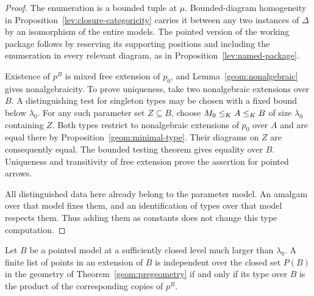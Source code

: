 \begin{proof}
The enumeration is a bounded tuple at $\mu$.  Bounded-diagram
homogeneity in Proposition~\ref{lev:closure-categoricity} carries it
between any two instances of $\Delta$ by an isomorphism of the entire
models.  The pointed version of the working package follows by
reserving its supporting positions and including the enumeration in
every relevant diagram, as in
Proposition~\ref{lev:named-package}.

Existence of $p^B$ is mixed free extension of $p_0$, and
Lemma~\ref{geom:nonalgebraic} gives nonalgebraicity.  To prove
uniqueness, take two nonalgebraic extensions over $B$.  A distinguishing
test for singleton types may be chosen with a fixed bound below
$\lambda_0$.  For any such parameter set $Z\subseteq B$, choose
$M_0\leq_K A\leq_K B$ of size $\lambda_0$ containing $Z$.
Both types restrict to nonalgebraic extensions of $p_0$ over $A$ and
are equal there by Proposition~\ref{geom:minimal-type}.  Their
diagrams on $Z$ are consequently equal.  The bounded testing theorem
gives equality over $B$.  Uniqueness and transitivity of free
extension prove the assertion for pointed arrows.

All distinguished data here already belong to the parameter model.
An amalgam over that model fixes them, and an identification of types
over that model respects them.  Thus adding them as constants does
not change this type computation.
\end{proof}

\begin{proposition}
\label{geom:base-change}
Let $B$ be a pointed model at a sufficiently closed level much larger
than $\lambda_0$.  A finite list of points in an extension of $B$ is
independent over the closed set $P(B)$ in the geometry of
Theorem~\ref{geom:pregeometry} if and only if its type over $B$ is the
product of the corresponding copies of $p^B$.
\end{proposition}

